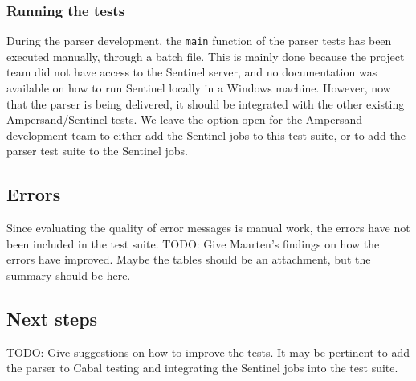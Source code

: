   \subsubsection{Running the tests}
  During the parser development, the \texttt{main} function of the parser tests has been executed manually, through a batch file.
  This is mainly done because the project team did not have access to the Sentinel server, and no documentation was available on how to run Sentinel locally in a Windows machine.
  However, now that the parser is being delivered, it should be integrated with the other existing Ampersand/Sentinel tests.
  We leave the option open for the Ampersand development team to either add the Sentinel jobs to this test suite, or to add the parser test suite to the Sentinel jobs.
  
\subsection{Errors}
  Since evaluating the quality of error messages is manual work, the errors have not been included in the test suite.
  TODO: Give Maarten's findings on how the errors have improved. Maybe the tables should be an attachment, but the summary should be here.

\subsection{Next steps}
  TODO: Give suggestions on how to improve the tests.
  It may be pertinent to add the parser to Cabal testing and integrating the Sentinel jobs into the test suite.